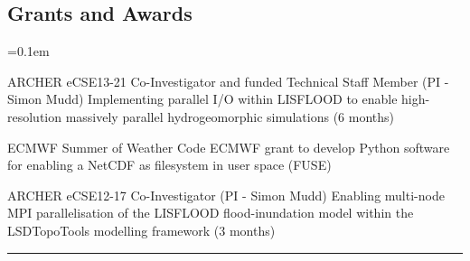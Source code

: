 \documentclass[10.5pt,a4]{article}
\makeatletter
\newcommand{\headerrow}[2]
{\begin{tabular*}{\linewidth}{l@{\extracolsep{\fill}}r}
	#1 &
	#2 \\
\end{tabular*}}
\makeatother
\begin{document}
\subsection*{Grants and Awards}
	\parskip=0.1em
\begin{itemize*}
	\item 
	  {ARCHER eCSE13-21 Co-Investigator and funded Technical Staff Member (PI - Simon Mudd)}
	  {Implementing parallel I/O within LISFLOOD to enable high-resolution massively parallel hydrogeomorphic simulations (6  months)}
	  
	\item 
	  {ECMWF Summer of Weather Code}
	  {ECMWF grant to develop Python software for enabling a NetCDF as filesystem in user space (FUSE)}

	\item 
	  {ARCHER eCSE12-17 Co-Investigator (PI - Simon Mudd)}
	  {Enabling multi-node MPI parallelisation of the LISFLOOD flood-inundation model within the LSDTopoTools modelling framework (3  months) }



\end{itemize*}

\hrule
\vspace{-0.4em}
\end{document}
